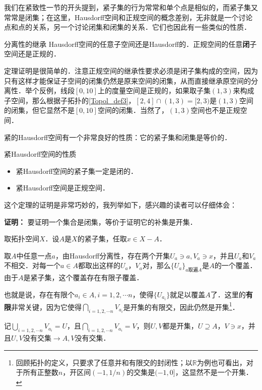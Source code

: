 我们在紧致性一节的开头提到，紧子集的行为常常和单个点是相似的，而紧子集又常常是闭集；在这里，Hausdorff空间和正规空间的概念差别，无非就是一个讨论点和点的关系，另一个讨论闭集和闭集的关系．它们也因此有一些类似的性质．

\begin{theorem}{分离性的继承}
Hausdorff空间的任意子空间还是Hausdorff的．正规空间的任意\textbf{闭}子空间还是正规的．
\end{theorem}

定理证明是很简单的．注意正规空间的继承性要求必须是闭子集构成的空间，因为只有这样才能保证子空间的闭集仍然是原来空间的闭集，从而直接继承原空间的分离性．举个反例，线段$[0,10]$上的度量空间是正规的，如果取子集$(1,3)$来构成子空间，那么根据子拓扑的\autoref{Topol_def3}，$[2,4]\cap(1,3)=[2,3)$是$(1,3)$空间的闭集，但它显然不是$[0,10]$空间的闭集．当然了，$(1,3)$空间也不是正规空间．

紧的Hausdorff空间有一个非常良好的性质：它的紧子集和闭集是等价的．
\begin{theorem}{紧Hausdorff空间的性质}
\begin{itemize}
\item 紧Hausdorff空间的紧子集一定是闭的．
\item 紧Hausdorff空间是正规空间．

\end{itemize}
\end{theorem}

这个定理的证明是非常巧妙的，我列举如下，感兴趣的读者可以仔细体会：

\textbf{证明：}
要证明一个集合是闭集，等价于证明它的补集是开集．

取拓扑空间$X$．设$A$是$X$的紧子集，任取$x\in X-A$．

取$A$中任意一点$a$，由Hausdorff分离性，存在两个开集$U_a\ni a, V_a\ni x$，并且$U_a$和$V_a$不相交．对每一个$a\in A$都取出这样的$U_a$，$V_a$对，那么$\{U_a\}_{a\text{取遍}A}$是$A$的一个覆盖．由于$A$是紧子集，这个覆盖存在有限子覆盖．

也就是说，存在有限个$a_i\in A, i=1, 2, \cdots n$，使得$\{U_{a_i}\}$就足以覆盖$A$了．这里的\textbf{有限}非常关键，因为它使得$\bigcap\limits_{i=1,2, \cdots n}V_{a_i}$是开集的有限交，因此仍然是开集\footnote{回顾拓扑的定义，只要求了任意并和有限交的封闭性；以$\mathbb{R}$为例也可看出，对于所有正整数$n$，开区间$(-1,1/n)$的交集是$(-1, 0]$，这显然不是一个开集．}．

记$\bigcup\limits_{i=1,2, \cdots n}V_{a_i}=U$，且$\bigcap\limits_{i=1,2, \cdots n}V_{a_i}=V$，则$U, V$都是开集，$U\supseteq A$，$V\ni x$，并且$U, V$没有交集$\rightarrow A, V$没有交集．

